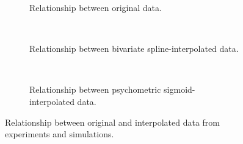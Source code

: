 \begin{multicols}{2}

\begin{figure}[H]
     \centering
    \begin{subfigure}[t]{0.41\textwidth}
        \centering
        
        \caption{Relationship between original data.}
        \label{fig:relationship-original}
    \end{subfigure}
    \\ \vspace{\baselineskip}
    \begin{subfigure}[t]{0.41\textwidth}
        \centering
        
        \caption{Relationship between bivariate spline-interpolated data.}
        \label{fig:relationship-spline}
    \end{subfigure}
    \\ \vspace{\baselineskip}
    \begin{subfigure}[t]{0.41\textwidth}
        \centering
        
        \caption{Relationship between psychometric sigmoid-interpolated data.}
        \label{fig:relationship-sigmoid}
    \end{subfigure}
    \caption[Simulations-experiments relationships]{Relationship between original and interpolated data from experiments and simulations.}
    \label{fig:all-relationships}
\end{figure}

\columnbreak


\end{multicols}
